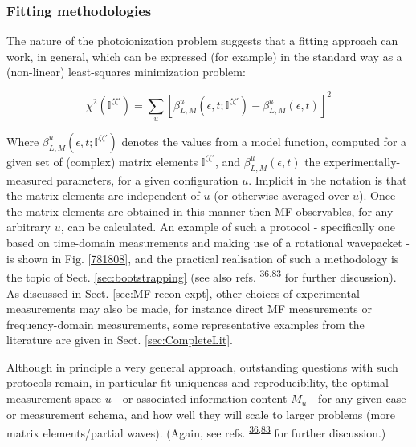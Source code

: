 \documentclass[10pt]{article}
\begin{document}
\subsubsection{Fitting methodologies\label{sec:fitting-intro}}

The nature of the photoionization problem suggests that a fitting approach can work, in general, which can be expressed (for example) in the standard way as a (non-linear) least-squares minimization problem:

\begin{equation}
\chi^{2}(\mathbb{I}^{\zeta\zeta'})=\sum_{u}\left[\beta^{u}_{L,M}(\epsilon,t;\mathbb{I}^{\zeta\zeta'})-\beta^{u}_{L,M}(\epsilon,t)\right]^{2}\label{eq:chi2-I}
\end{equation}

Where $\beta^{u}_{L,M}(\epsilon,t;\mathbb{I}^{\zeta\zeta'})$ denotes  the values from a model function, computed for a given set of (complex) matrix elements $\mathbb{I}^{\zeta\zeta'}$, and $\beta^{u}_{L,M}(\epsilon,t)$ the experimentally-measured parameters, for a given configuration $u$. Implicit in the notation is that the matrix elements are independent of $u$ (or otherwise averaged over $u$). Once the matrix elements are obtained in this manner then MF observables, for any arbitrary $u$, can be calculated. An example of such a protocol - specifically one based on time-domain measurements and making use of a rotational wavepacket - is shown in Fig. \ref{781808}, %
and the practical realisation of such a methodology is the topic of Sect. \ref{sec:bootstrapping} (see also refs. \textsuperscript{\hyperref[csl:36]{36},\hyperref[csl:83]{83}} for further discussion). As discussed in Sect. \ref{sec:MF-recon-expt}, other choices of experimental measurements may also be made, for instance direct MF measurements or frequency-domain measurements, some representative examples from the literature are given in Sect. \ref{sec:CompleteLit}. 

Although in principle a very general approach, outstanding questions with such protocols remain, in particular fit uniqueness and reproducibility, the optimal measurement space $u$ - or associated information content $M_u$ - for any given case or measurement schema, and how well they will scale to larger problems (more matrix elements/partial waves). (Again, see refs. \textsuperscript{\hyperref[csl:36]{36},\hyperref[csl:83]{83}} for further discussion.)
\end{document}

